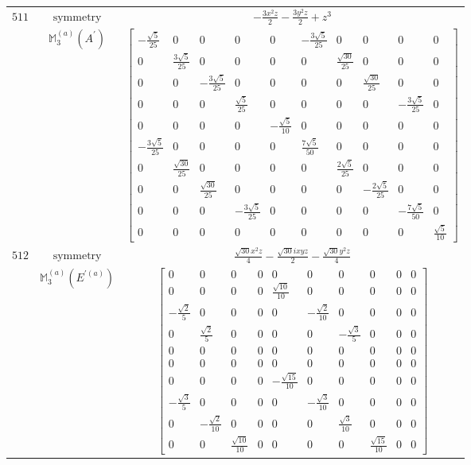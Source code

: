 \documentclass[fleqn,8pt,landscape]{jsarticle}
\begin{document}
\begin{longtable}{ccc}
$ 511 $ & $ \text{symmetry} $ & $ - \frac{3 x^{2} z}{2} - \frac{3 y^{2} z}{2} + z^{3} $ \\
$  $ & $ \mathbb{M}_{3}^{(a)}(A^{\prime}) $ & $ \begin{bmatrix} - \frac{\sqrt{5}}{25} & 0 & 0 & 0 & 0 & - \frac{3 \sqrt{5}}{25} & 0 & 0 & 0 & 0 \\ 0 & \frac{3 \sqrt{5}}{25} & 0 & 0 & 0 & 0 & \frac{\sqrt{30}}{25} & 0 & 0 & 0 \\ 0 & 0 & - \frac{3 \sqrt{5}}{25} & 0 & 0 & 0 & 0 & \frac{\sqrt{30}}{25} & 0 & 0 \\ 0 & 0 & 0 & \frac{\sqrt{5}}{25} & 0 & 0 & 0 & 0 & - \frac{3 \sqrt{5}}{25} & 0 \\ 0 & 0 & 0 & 0 & - \frac{\sqrt{5}}{10} & 0 & 0 & 0 & 0 & 0 \\ - \frac{3 \sqrt{5}}{25} & 0 & 0 & 0 & 0 & \frac{7 \sqrt{5}}{50} & 0 & 0 & 0 & 0 \\ 0 & \frac{\sqrt{30}}{25} & 0 & 0 & 0 & 0 & \frac{2 \sqrt{5}}{25} & 0 & 0 & 0 \\ 0 & 0 & \frac{\sqrt{30}}{25} & 0 & 0 & 0 & 0 & - \frac{2 \sqrt{5}}{25} & 0 & 0 \\ 0 & 0 & 0 & - \frac{3 \sqrt{5}}{25} & 0 & 0 & 0 & 0 & - \frac{7 \sqrt{5}}{50} & 0 \\ 0 & 0 & 0 & 0 & 0 & 0 & 0 & 0 & 0 & \frac{\sqrt{5}}{10} \end{bmatrix} $ \\ \hline
$ 512 $ & $ \text{symmetry} $ & $ \frac{\sqrt{30} x^{2} z}{4} - \frac{\sqrt{30} i x y z}{2} - \frac{\sqrt{30} y^{2} z}{4} $ \\
$  $ & $ \mathbb{M}_{3}^{(a)}(E^{\prime(a)}) $ & $ \begin{bmatrix} 0 & 0 & 0 & 0 & 0 & 0 & 0 & 0 & 0 & 0 \\ 0 & 0 & 0 & 0 & \frac{\sqrt{10}}{10} & 0 & 0 & 0 & 0 & 0 \\ - \frac{\sqrt{2}}{5} & 0 & 0 & 0 & 0 & - \frac{\sqrt{2}}{10} & 0 & 0 & 0 & 0 \\ 0 & \frac{\sqrt{2}}{5} & 0 & 0 & 0 & 0 & - \frac{\sqrt{3}}{5} & 0 & 0 & 0 \\ 0 & 0 & 0 & 0 & 0 & 0 & 0 & 0 & 0 & 0 \\ 0 & 0 & 0 & 0 & 0 & 0 & 0 & 0 & 0 & 0 \\ 0 & 0 & 0 & 0 & - \frac{\sqrt{15}}{10} & 0 & 0 & 0 & 0 & 0 \\ - \frac{\sqrt{3}}{5} & 0 & 0 & 0 & 0 & - \frac{\sqrt{3}}{10} & 0 & 0 & 0 & 0 \\ 0 & - \frac{\sqrt{2}}{10} & 0 & 0 & 0 & 0 & \frac{\sqrt{3}}{10} & 0 & 0 & 0 \\ 0 & 0 & \frac{\sqrt{10}}{10} & 0 & 0 & 0 & 0 & \frac{\sqrt{15}}{10} & 0 & 0 \end{bmatrix} $ \\ \hline

\end{longtable}
\end{document}
